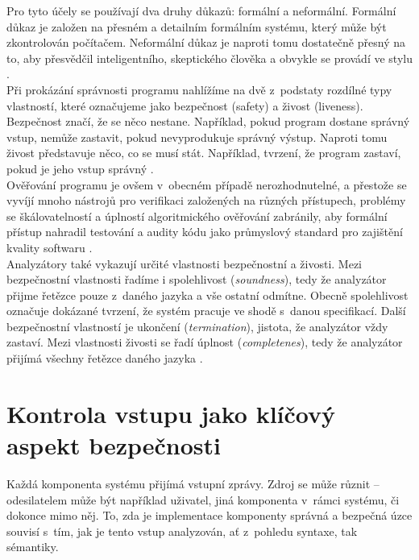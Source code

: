 Pro tyto účely se používají dva druhy důkazů: formální a neformální. Formální důkaz je založen na přesném a detailním formálním systému, který může být 
zkontrolován počítačem. Neformální důkaz je naproti tomu dostatečně přesný na to, aby přesvědčil inteligentního, skeptického člověka a obvykle se 
provádí ve stylu  \cite[str. 125]{Lamport1977}. \\

Při prokázání správnosti programu nahlížíme na dvě z~podstaty rozdílné typy vlastností, které označujeme jako bezpečnost (safety) a živost (liveness). 
Bezpečnost značí, že se něco nestane. Například, pokud program dostane správný vstup, nemůže zastavit, pokud nevyprodukuje správný výstup. Naproti tomu 
živost představuje něco, co se musí stát. Například, tvrzení, že program zastaví, pokud je jeho vstup správný \cite[str. 125]{Lamport1977}. \\

Ověřování programu je ovšem v~obecném případě nerozhodnutelné, a přestože se vyvíjí mnoho nástrojů pro verifikaci založených na různých přístupech, 
problémy se škálovatelností a úplností algoritmického ověřování zabránily, aby formální přístup nahradil testování a audity kódu jako průmyslový 
standard pro zajištění kvality softwaru \cite[str. 490]{Sass2013}. \\

Analyzátory také vykazují určité vlastnosti bezpečnostní a živosti. Mezi bezpečnostní vlastnosti řadíme i spolehlivost (\textit{soundness}), 
tedy že analyzátor přijme řetězce pouze z~daného jazyka a vše ostatní odmítne. Obecně spolehlivost označuje dokázané tvrzení, že systém pracuje 
ve shodě s~danou specifikací. Další bezpečnostní vlastností je ukončení (\textit{termination}), jistota, že analyzátor vždy zastaví. 
Mezi vlastnosti živosti se řadí úplnost (\textit{completenes}), tedy že analyzátor přijímá všechny řetězce daného jazyka \cite[str. 490]{Sass2013}.

\section{Kontrola vstupu jako klíčový aspekt bezpečnosti} \label{sec:4:inputcontrol}
Každá komponenta systému přijímá vstupní zprávy. Zdroj se může různit – odesilatelem může být například uživatel, jiná komponenta v~rámci systému, 
či dokonce mimo něj. To, zda je implementace komponenty správná a bezpečná úzce souvisí s~tím, jak je tento vstup  analyzován, ať z~pohledu syntaxe, 
tak sémantiky. \\

